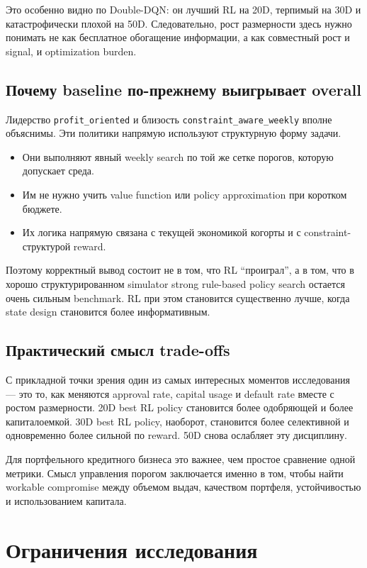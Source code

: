 \documentclass[12pt,a4paper]{article}
\begin{document}
Это особенно видно по Double-DQN: он лучший RL на 20D, терпимый на 30D и катастрофически плохой на 50D. Следовательно, рост размерности здесь нужно понимать не как бесплатное обогащение информации, а как совместный рост и signal, и optimization burden.

\subsection{Почему baseline по-прежнему выигрывает overall}

Лидерство \texttt{profit\_oriented} и близость \texttt{constraint\_aware\_weekly} вполне объяснимы. Эти политики напрямую используют структурную форму задачи.
\begin{itemize}[leftmargin=*]
    \item Они выполняют явный weekly search по той же сетке порогов, которую допускает среда.
    \item Им не нужно учить value function или policy approximation при коротком бюджете.
    \item Их логика напрямую связана с текущей экономикой когорты и с constraint-структурой reward.
\end{itemize}

Поэтому корректный вывод состоит не в том, что RL ``проиграл'', а в том, что в хорошо структурированном simulator strong rule-based policy search остается очень сильным benchmark. RL при этом становится существенно лучше, когда state design становится более информативным.

\subsection{Практический смысл trade-offs}

С прикладной точки зрения один из самых интересных моментов исследования --- это то, как меняются approval rate, capital usage и default rate вместе с ростом размерности. 20D best RL policy становится более одобряющей и более капиталоемкой. 30D best RL policy, наоборот, становится более селективной и одновременно более сильной по reward. 50D снова ослабляет эту дисциплину.

Для портфельного кредитного бизнеса это важнее, чем простое сравнение одной метрики. Смысл управления порогом заключается именно в том, чтобы найти workable compromise между объемом выдач, качеством портфеля, устойчивостью и использованием капитала.

\section{Ограничения исследования}
\end{document}
